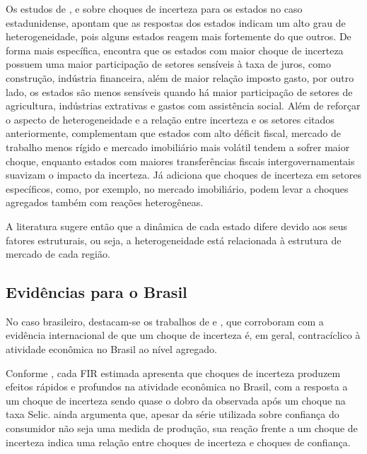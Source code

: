 Os estudos de ,  e  sobre choques de incerteza para os estados no caso estadunidense, apontam que as respostas dos estados indicam um alto grau de heterogeneidade, pois alguns estados reagem mais fortemente do que outros. De forma mais específica,  encontra que os estados com maior choque de incerteza possuem uma maior participação de setores sensíveis à taxa de juros, como construção, indústria financeira, além de maior relação imposto gasto, por outro lado, os estados são menos sensíveis quando há maior participação de setores de agricultura, indústrias extrativas e gastos com assistência social. Além de reforçar o aspecto de heterogeneidade e a relação entre incerteza e os setores citados anteriormente,  complementam que estados com alto déficit fiscal, mercado de trabalho menos rígido e mercado imobiliário mais volátil  tendem a sofrer maior choque, enquanto estados com maiores transferências fiscais intergovernamentais suavizam o impacto da incerteza. Já  adiciona que choques de incerteza em setores específicos, como, por exemplo, no mercado imobiliário, podem levar a choques agregados também com reações heterogêneas.
\par

A literatura sugere então que a dinâmica de cada estado difere devido aos seus fatores estruturais, ou seja, a heterogeneidade está relacionada à estrutura de mercado de cada região. 

\subsection{Evidências para o Brasil}
No caso brasileiro, destacam-se os trabalhos de  e , que corroboram com a evidência internacional de que um choque de incerteza é, em geral, contracíclico à atividade econômica no Brasil ao nível agregado.
\par

Conforme , cada \gls{FIR} estimada apresenta que choques de incerteza produzem efeitos rápidos e profundos na atividade econômica no Brasil, com a resposta a um choque de incerteza sendo quase o dobro da observada após um choque na taxa Selic.  ainda argumenta que, apesar da série utilizada sobre confiança do consumidor não seja uma medida de produção, sua reação frente a um choque de incerteza indica uma relação entre choques de incerteza e choques de confiança.
\par

